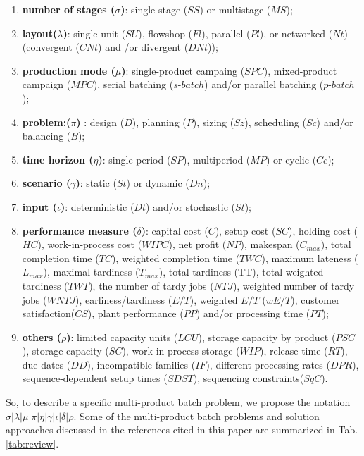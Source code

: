 \documentclass[10pt,fleqn,a4paper,twoside]{article}
\begin{document}
\begin{enumerate}[label=\arabic*)]
\item \textbf{number of stages ($\sigma$)}: single stage ($SS$) or multistage ($MS$);
\item \textbf{layout($\lambda$)}: single unit ($SU$), flowshop ($Fl$), parallel ($Pl$), or networked ($Nt$) (convergent ($CNt$) and /or divergent ($DNt$));
\item \textbf{production mode ($\mu$)}: single-product campaing ($SPC$), mixed-product campaign ($MPC$), serial batching ($s\textrm{-}batch$) and/or parallel batching ($p\textrm{-}batch$);
\item \textbf{problem:($\pi$)}  : design ($D$), planning ($P$), sizing ($Sz$), scheduling ($Sc$) and/or balancing ($B$); 
\item \textbf{time horizon ($\eta$)}: single period ($SP$), multiperiod ($MP$) or cyclic ($Cc$);
\item \textbf{scenario ($\gamma$)}: static ($St$) or dynamic ($Dn$);
\item \textbf{input ($\iota$)}: deterministic ($Dt$) and/or stochastic ($St$);
\item \textbf{performance measure ($\delta$)}: capital cost ($C$), setup cost ($SC$), holding cost ($HC$), work-in-process cost ($WIPC$), net profit ($NP$), makespan ($C_{max}$), total completion time ($TC$), weighted completion time ($TWC$), maximum lateness ($L_{max}$), maximal tardiness ($T_{max}$), total tardiness (TT), total weighted tardiness ($TWT$), the number of tardy jobs ($NTJ$), weighted number of tardy jobs ($WNTJ$), earliness/tardiness ($E/T$), weighted $E/T$ ($wE/T$), customer satisfaction($CS$), plant performance ($PP$) and/or processing time ($PT$);
\item \textbf{others ($\rho$)}: limited capacity units ($LCU$), storage capacity by product ($PSC$), storage capacity ($SC$), work-in-process storage ($WIP$), release time ($RT$), due dates ($DD$), incompatible families ($IF$), different processing rates ($DPR$), sequence-dependent setup times ($SDST$), sequencing constraints($SqC$).
\end{enumerate}

So, to describe a speciﬁc multi-product batch problem, we propose the notation $\sigma|\lambda|\mu|\pi|\eta|\gamma|\iota|\delta|\rho$. Some of the multi-product batch problems and solution approaches discussed in the references cited in this paper are summarized in Tab. \ref{tab:review}.
\end{document}
